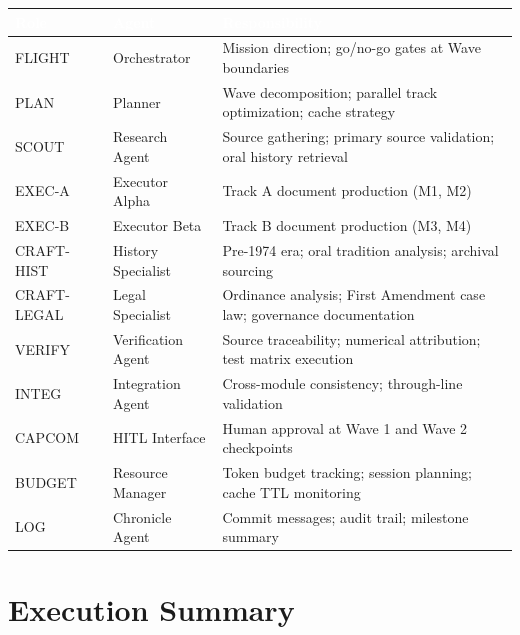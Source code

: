 \documentclass[11pt,letterpaper]{article}
\newcommand{\tableheader}[1]{\textbf{\sffamily\textcolor{white}{#1}}}
\begin{document}
\begin{center}
\begin{tabularx}{\textwidth}{L{2cm}L{3cm}X}
\toprule
{}
\tableheader{Role} & \tableheader{Agent} & \tableheader{Responsibility} \\
\midrule
FLIGHT & Orchestrator & Mission direction; go/no-go gates at Wave boundaries \\
PLAN & Planner & Wave decomposition; parallel track optimization; cache strategy \\
SCOUT & Research Agent & Source gathering; primary source validation; oral history retrieval \\
EXEC-A & Executor Alpha & Track A document production (M1, M2) \\
EXEC-B & Executor Beta & Track B document production (M3, M4) \\
CRAFT-HIST & History Specialist & Pre-1974 era; oral tradition analysis; archival sourcing \\
CRAFT-LEGAL & Legal Specialist & Ordinance analysis; First Amendment case law; governance documentation \\
VERIFY & Verification Agent & Source traceability; numerical attribution; test matrix execution \\
INTEG & Integration Agent & Cross-module consistency; through-line validation \\
CAPCOM & HITL Interface & Human approval at Wave 1 and Wave 2 checkpoints \\
BUDGET & Resource Manager & Token budget tracking; session planning; cache TTL monitoring \\
LOG & Chronicle Agent & Commit messages; audit trail; milestone summary \\
\bottomrule
\end{tabularx}
\end{center}

\section{Execution Summary}
\end{document}
